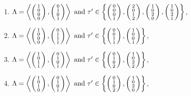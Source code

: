 \begin{prop}
\begin{enumerate}
\item 
$\Lambda=\plan{1\\0\\0\\0}{0\\1\\0\\1} \text{ and } \tau' \in \left\{ \vect{0\\0\\0\\1},\vect{2\\0\\1\\2},\vect{1\\0\\2\\0},\vect{1\\0\\2\\1} \right\}$,
\item
$\Lambda=\plan{1\\0\\0\\0}{0\\1\\1\\1} \text{ and } \tau' \in \left\{ \vect{0\\0\\1\\1},\vect{1\\0\\0\\1} \right\}$,

\item
$\Lambda=\plan{1\\0\\1\\1}{0\\1\\0\\1} \text{ and } \tau' \in \left\{ \vect{0\\1\\0\\2},\vect{1\\0\\2\\2} \right\}$,

\item
$\Lambda=\plan{1\\0\\1\\0}{0\\1\\0\\1} \text{ and } \tau' \in \left\{ \vect{0\\1\\0\\2},\vect{1\\0\\2\\0} \right\}$,


\end{enumerate}
\end{prop}

